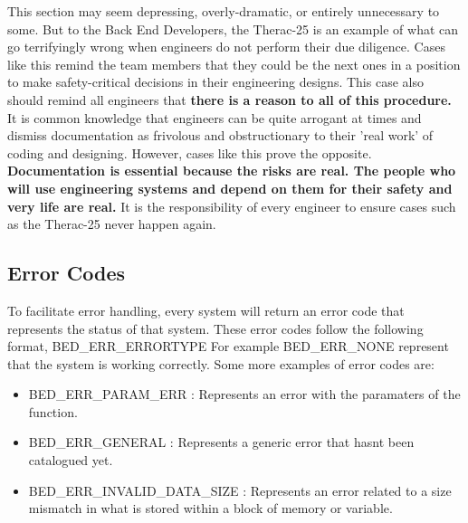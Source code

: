 \documentclass{article}
\begin{document}
This section may seem depressing, overly-dramatic, or entirely unnecessary to some. But to the Back End Developers, the Therac-25 is an example of what can go terrifyingly wrong when engineers do not perform their due diligence. Cases like this remind the team members that they could be the next ones in a position to make safety-critical decisions in their engineering designs. This case also should remind all engineers that \textbf{there is a reason to all of this procedure.} It is common knowledge that engineers can be quite arrogant at times and dismiss documentation as frivolous and obstructionary to their 'real work' of coding and designing. However, cases like this prove the opposite. \textbf{Documentation is essential because the risks are real. The people who will use engineering systems and depend on them for their safety and very life are real.} It is the responsibility of every engineer to ensure cases such as the Therac-25 never happen again.\\

\subsection*{Error Codes}
To facilitate error handling, every system will return an error code that represents the status of that system. These error codes follow the following format, BED\_ERR\_ERRORTYPE
For example BED\_ERR\_NONE represent that the system is working correctly. Some more examples of error codes are:
\begin{itemize}
	\item BED\_ERR\_PARAM\_ERR		 	: Represents an error with the paramaters of the function.
	\item BED\_ERR\_GENERAL			 	: Represents a generic error that hasnt been catalogued yet.
	\item BED\_ERR\_INVALID\_DATA\_SIZE	: Represents an error related to a size mismatch in what is stored within a block of memory or variable.
\end{itemize}




\nocite{*}
































\end{document}
